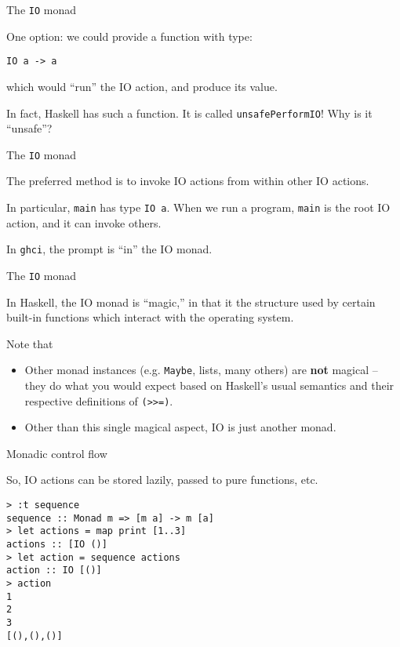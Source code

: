 %
\begin{frame}[fragile]{The \texttt{IO} monad}

One option: we could provide a function with type:

\begin{block}{}
\begin{verbatim}
IO a -> a
\end{verbatim}
\end{block}

which would ``run'' the IO action, and produce its value.

In fact, Haskell has such a function. It is called \texttt{unsafePerformIO}! Why
is it ``unsafe''?

\end{frame}

%
\begin{frame}[fragile]{The \texttt{IO} monad}

The preferred method is to invoke IO actions from within other IO actions.

In particular, \texttt{main} has type \texttt{IO a}. When we run a program,
\texttt{main} is the root IO action, and it can invoke others.

In \texttt{ghci}, the prompt is ``in'' the IO monad.

\end{frame}

%
\begin{frame}[fragile]{The \texttt{IO} monad}

In Haskell, the IO monad is ``magic,'' in that it the structure used by certain
built-in functions which interact with the operating system.

Note that

\begin{itemize}

\item Other monad instances (e.g. \texttt{Maybe}, lists, many others) are
\textbf{not} magical -- they do what you would expect based on Haskell's usual
semantics and their respective definitions of \texttt{(>>=)}.

\item Other than this single magical aspect, IO is just another monad.

\end{itemize}

\end{frame}

%
\begin{frame}[fragile]{Monadic control flow}

So, IO actions can be stored lazily, passed to pure functions, etc.

\begin{block}{}
\begin{verbatim}
> :t sequence
sequence :: Monad m => [m a] -> m [a]
> let actions = map print [1..3]
actions :: [IO ()]
> let action = sequence actions
action :: IO [()]
> action
1
2
3
[(),(),()]
\end{verbatim}
\end{block}

\end{frame}

